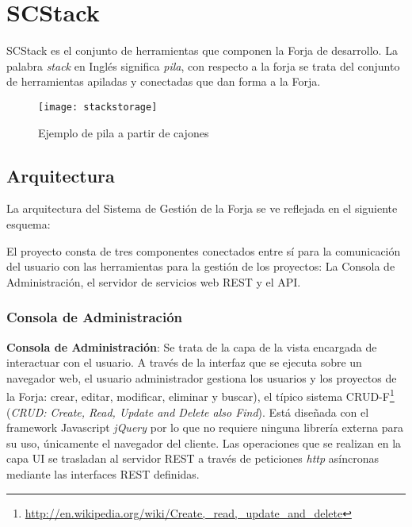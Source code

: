 
\chapter{SCStack}
\label{chap:scstack}

\par SCStack es el conjunto de herramientas que componen la Forja de desarrollo. La palabra \emph{stack} en Inglés significa \emph{pila}, con respecto a la forja se trata del conjunto de herramientas apiladas y conectadas que dan forma a la Forja.

\begin{figure}[H]
    \centering
    \texttt{[image: stackstorage]}
    \caption{Ejemplo de pila a partir de cajones}
    \label{fig:stackstorage}
\end{figure}

\section{Arquitectura}
\label{sec:arquitectura}

\par La arquitectura del Sistema de Gestión de la Forja se ve reflejada en el siguiente esquema:


\par El proyecto consta de tres componentes conectados entre sí para la comunicación del usuario con las herramientas para la gestión de los proyectos: La Consola de Administración, el servidor de servicios web REST y el API.


\subsection{Consola de Administración}
\label{sub:consola-admin}

\par \textbf{Consola de Administración}: Se trata de la capa de la vista encargada de interactuar con el usuario. A través de la interfaz que se ejecuta sobre un navegador web, el usuario administrador gestiona los usuarios y los proyectos de la Forja: crear, editar, modificar, eliminar y buscar), el típico sistema CRUD-F\footnote{\url{http://en.wikipedia.org/wiki/Create,\_read,\_update\_and\_delete}} (\emph{CRUD: Create, Read, Update and Delete also Find}). Está diseñada con el framework Javascript \emph{jQuery} por lo que no requiere ninguna librería externa para su uso, únicamente el navegador del cliente. Las operaciones que se realizan en la capa UI se trasladan al servidor REST a través de peticiones \emph{http} asíncronas mediante las interfaces REST definidas.

